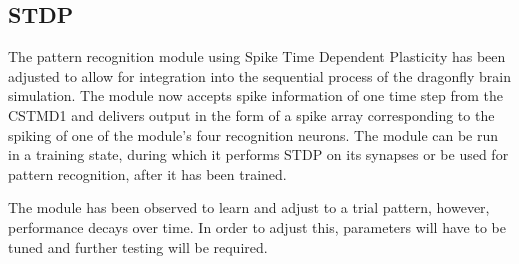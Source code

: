 \subsection{STDP}

The pattern recognition module using Spike Time Dependent Plasticity has been adjusted to allow for integration into the sequential process of the dragonfly brain simulation. The module now accepts spike information of one time step from the CSTMD1 and delivers output in the form of a spike array corresponding to the spiking of one of the module's four recognition neurons. The module can be run in a training state, during which it performs STDP on its synapses or be used for pattern recognition, after it has been trained.

The module has been observed to learn and adjust to a trial pattern, however, performance decays over time. In order to adjust this, parameters will have to be tuned and further testing will be required.


